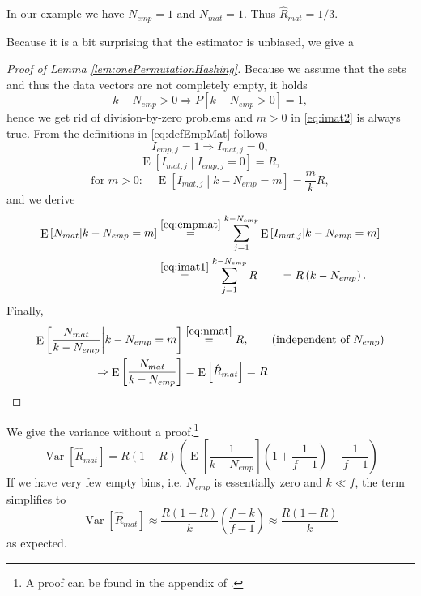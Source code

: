 \documentclass[a4paper]{article}
\DeclareMathOperator{\Var}{Var}
\DeclareMathOperator{\E}{E}
\begin{document}
In our example we have $N_{emp}=1$ and $N_{mat}=1$. Thus $\hat{R}_{mat}=1/3$.

Because it is a bit surprising that the estimator is unbiased, we give a

\begin{proof}[Proof of Lemma \vref{lem:onePermutationHashing}]
Because we assume that the sets and thus the data vectors are not completely empty, it holds
\begin{equation*}
k-N_{emp} > 0 \Rightarrow P\left[ k-N_{emp}>0 \right]=1, 
\end{equation*}
hence we get rid of division-by-zero problems and $m>0$ in \vref{eq:imat2} is always true.
From the definitions in \vref{eq:defEmpMat} follows
\begin{equation}\label{eq:empmat}
I_{emp,j} = 1 \Rightarrow I_{mat,j}=0,
\end{equation}
\begin{equation}\label{eq:imat1}
\E \left[ I_{mat,j} \middle\vert I_{emp,j} = 0 \right] = R,
\end{equation}
\begin{equation}\label{eq:imat2}
\text{for } m > 0: \quad \E \left[ I_{mat,j} \middle\vert k-N_{emp}=m \right] = \frac{m}{k}R,
\end{equation}
and we derive
\begin{equation}\label{eq:nmat}
\begin{split}
\E \left[ N_{mat} \middle\vert k-N_{emp}=m \right] &\overset{\ref{eq:empmat}}{=} \sum_{j=1}^{k-N_{emp}} \E \left[ I_{mat,j} \middle\vert k-N_{emp}=m \right] \\
& \overset{\ref{eq:imat1}}{=} \sum_{j=1}^{k-N_{emp}} R \qquad = R \left( k-N_{emp} \right).
\end{split}
\end{equation}
Finally,
\begin{equation}
\begin{split}
\E \left[ \frac{N_{mat}}{k-N_{emp}} \middle\vert k-N_{emp}=m \right] &  \overset{\ref{eq:nmat}}{=} R, \qquad \text{(independent of $N_{emp}$)} \\
\Rightarrow \E \left[ \frac{N_{mat}}{k-N_{emp}} \right] & \overset{}{=} \E \left[ \hat{R}_{mat} \right] = R
\end{split}
\end{equation}
\end{proof}

We give the variance without a proof.\footnote{A proof can be found in the appendix of \citep{LiOwZhang12}.}
\begin{equation}
\Var \left[ \hat{R}_{mat} \right] = R(1-R) \left( \E \left[ \frac{1}{k-N_{emp}} \right] \left( 1 + \frac{1}{f-1} \right) - \frac{1}{f-1} \right)
\end{equation}
If we have very few empty bins, i.e. $N_{emp}$ is essentially zero and $k \ll f$, the term simplifies to
\begin{equation}
\Var \left[ \hat{R}_{mat} \right] \approx \frac{R(1-R)}{k} \left( \frac{f-k}{f-1} \right) \approx \frac{R(1-R)}{k}
\end{equation}
as expected.
\end{document}
